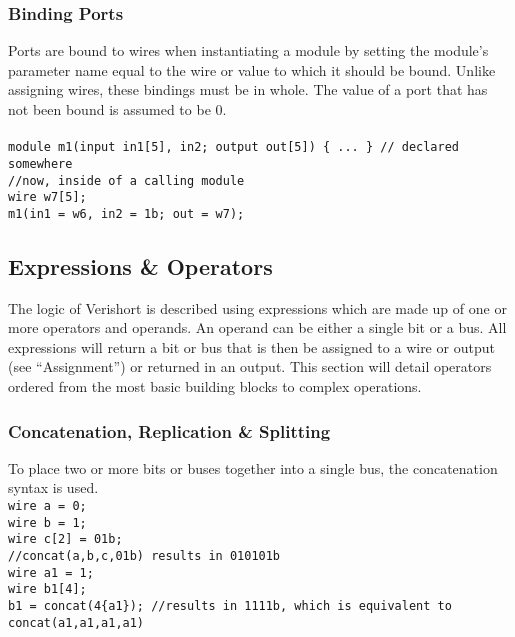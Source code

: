 \documentclass[letterpaper,11pt]{article}
\begin{document}
        \subsubsection{Binding Ports}
        Ports are bound to wires when instantiating a module by setting the module’s parameter name 
        equal to the wire or value to which it should be bound. Unlike assigning wires, these bindings 
        must be in whole. The value of a port that has not been bound 
        is assumed to be 0. \\\\
        \texttt{module m1(input in1[5], in2; output out[5]) \{ ... \} // declared somewhere} \\
        \texttt{\slash\slash now, inside of a calling module} \\
        \texttt{wire w7[5];} \\
        \texttt{m1(in1 = w6, in2 = 1b; out = w7);}
    
    \subsection{Expressions \& Operators}
    The logic of Verishort is described using expressions which are made up of one 
    or more operators and operands. An operand can be either a single bit or a bus. 
    All expressions will return a bit or bus that is then be assigned to a wire or output 
    (see ``Assignment'') or returned in an output. This section will detail operators ordered from the 
    most basic building blocks to complex operations.
    
        \subsubsection{Concatenation, Replication \& Splitting}
        To place two or more bits or buses together into a single bus, the concatenation syntax is used. \\
        \texttt{wire a = 0;} \\
        \texttt{wire b = 1;} \\
        \texttt{wire c[2] = 01b;} \\
        \texttt{//concat(a,b,c,01b) results in 010101b} \\
        \texttt{wire a1 = 1;} \\
        \texttt{wire b1[4];} \\
        \texttt{b1 = concat(4\{a1\}); \slash\slash results in 1111b, which is equivalent to concat(a1,a1,a1,a1)} \\
        
\end{document}
